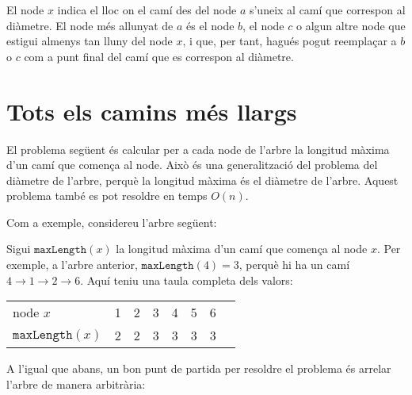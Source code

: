 El node $x$ indica el lloc on el camí des del node $a$ s'uneix al camí
que correspon al diàmetre. El node més allunyat de $a$ és el node $b$,
el node $c$ o algun altre node que estigui almenys tan lluny del node
$x$, i que, per tant, hagués pogut reemplaçar a $b$ o $c$ com a punt
final del camí que es correspon al diàmetre.

\section{Tots els camins més llargs}

El problema següent és calcular per a cada node de l'arbre la longitud
màxima d'un camí que comença al node. Això és una generalització del
problema del diàmetre de l'arbre, perquè la longitud màxima
és el diàmetre de l'arbre. Aquest problema també es pot resoldre en
temps $O(n)$.

Com a exemple, considereu l'arbre següent:
\begin{center}
\end{center}


Sigui $\texttt{maxLength}(x)$ la longitud màxima d'un camí que comença
al node $x$. Per exemple, a l'arbre anterior,
$\texttt{maxLength}(4)=3$, perquè hi ha un camí $4 \rightarrow 1
\rightarrow 2 \rightarrow 6$. Aquí teniu una taula completa dels
valors:
\begin{center}
\begin{tabular}{l|lllllll}
node $x$ & 1 & 2 & 3 & 4 & 5 & 6 \\
$\texttt{maxLength}(x)$ & 2 & 2 & 3 & 3 & 3 & 3 \\
\end{tabular}
\end{center}


A l'igual que abans, un bon punt de partida per resoldre el problema
és arrelar l'arbre de manera arbitrària:
\begin{center}
\end{center}


